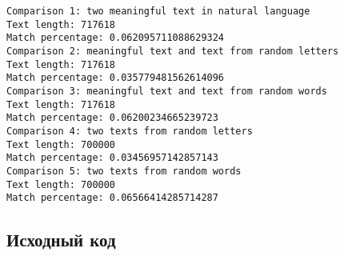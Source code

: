 \documentclass[12pt]{article}
\begin{document}
\begin{lstlisting}
Comparison 1: two meaningful text in natural language
Text length: 717618
Match percentage: 0.062095711088629324
Comparison 2: meaningful text and text from random letters
Text length: 717618
Match percentage: 0.035779481562614096
Comparison 3: meaningful text and text from random words
Text length: 717618
Match percentage: 0.06200234665239723
Comparison 4: two texts from random letters
Text length: 700000
Match percentage: 0.03456957142857143
Comparison 5: two texts from random words
Text length: 700000
Match percentage: 0.06566414285714287
\end{lstlisting}

\subsection*{Исходный код}
 
 
\lstset{style=mystyle}
 

\end{document}
